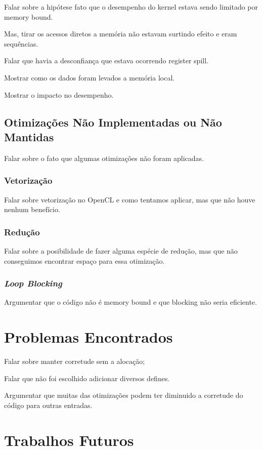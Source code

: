 \documentclass[paper=a4, fontsize=12pt]{scrartcl} %
\numberwithin{equation}{section} %
\numberwithin{figure}{section} %
\numberwithin{table}{section} %
\begin{document}
Falar sobre a hipótese fato que o desempenho do kernel estava sendo limitado por memory bound.

Mas, tirar os acessos diretos a memória não estavam surtindo efeito e eram sequências.

Falar que havia a desconfiança que estava ocorrendo register spill.

Mostrar como os dados foram levados a memória local.

Mostrar o impacto no desempenho.

\subsection{Otimizações Não Implementadas ou Não Mantidas}

Falar sobre o fato que algumas otimizações não foram aplicadas.

\subsubsection{Vetorização}

Falar sobre vetorização no OpenCL e como tentamos aplicar, mas que não houve nenhum benefício.

\subsubsection{Redução}

Falar sobre a posibilidade de fazer alguma espécie de redução, mas que não conseguimos encontrar espaço para essa otimização.

\subsubsection{\textit{Loop Blocking}}

Argumentar que o código não é memory bound e que blocking não seria eficiente.

\section{Problemas Encontrados}

Falar sobre manter corretude sem a alocação;

Falar que não foi escolhido adicionar diversos defines.

Argumentar que muitas das otimizações podem ter diminuido a corretude do código para outras entradas.

\section{Trabalhos Futuros}
\end{document}
